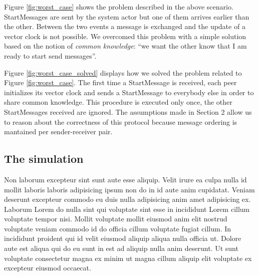 \documentclass[10pt]{article}
\begin{document}


\noindent
Figure \ref{fig:worst_case} shows the problem described in the above scenario. StartMessages are sent by the system actor but one of them arrives earlier than the other. Between the two events a message is exchanged and the update of a vector clock is not possible. We overcomed this problem with a simple solution based on the notion of \textit{common knowledge}: ``we want the other know that I am ready to start send messages''.



\noindent
Figure \ref{fig:worst_case_solved} displays how we solved the problem related to Figure \ref{fig:worst_case}. The first time a StartMessage is received, each peer initializes its vector clock and sends a StartMessage to everybody else in order to share common knowledge. This procedure is executed only once, the other StartMessages received are ignored. The assumptions made in Section 2 allow us to reason about the correctness of this protocol because message ordering is mantained per sender-receiver pair.


\subsection{The simulation}

\begin{figure}[ht]
	\centering
	\begin{minipage}{.5\textwidth}
	  \scalebox{.8}{}
	\end{minipage}%
	\begin{minipage}{.5\textwidth}
	  \scalebox{.8}{}
	\end{minipage}
\end{figure}



Non laborum excepteur sint sunt aute esse aliquip. Velit irure ea culpa nulla id mollit laboris laboris adipisicing ipsum non do in id aute anim cupidatat. Veniam deserunt excepteur commodo eu duis nulla adipisicing anim amet adipisicing ex. Laborum Lorem do nulla sint qui voluptate sint esse in incididunt Lorem cillum voluptate tempor nisi. Mollit voluptate mollit eiusmod anim elit nostrud voluptate veniam commodo id do officia cillum voluptate fugiat cillum. In incididunt proident qui id velit eiusmod aliquip aliqua nulla officia ut. Dolore aute est aliqua qui do eu sunt in est ad aliquip nulla anim deserunt. Ut sunt voluptate consectetur magna ex minim ut magna cillum aliquip elit voluptate ex excepteur eiusmod occaecat.
\end{document}
